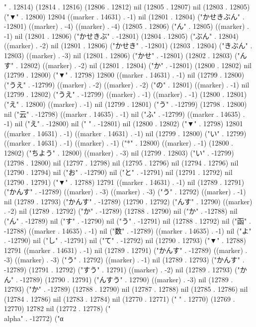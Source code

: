 " . 12814) (12814 . 12816) (12806 . 12812) nil (12805 . 12807) nil (12803 . 12805) ("▼" . 12800) 12804 ((marker . 14631) . -1) nil (12801 . 12804) ("かせきぶん" . -12801) ((marker) . -4) ((marker) . -4) (12805 . 12806) ("ん" . 12805) ((marker) . -1) nil (12801 . 12806) ("かせきぶ" . -12801) (12804 . 12805) ("ぶん" . 12804) ((marker) . -2) nil (12801 . 12806) ("かせき" . -12801) (12803 . 12804) ("きぶん" . 12803) ((marker) . -3) nil (12801 . 12806) ("かせ" . -12801) (12802 . 12803) ("んす" . 12802) ((marker) . -2) nil (12801 . 12804) ("か" . -12801) (12800 . 12802) nil (12799 . 12800) ("▼" . 12798) 12800 ((marker . 14631) . -1) nil (12799 . 12800) ("うえ" . -12799) ((marker) . -2) ((marker) . -2) ("の" . 12801) ((marker) . -1) nil (12799 . 12802) ("うえ" . -12799) ((marker) . -1) ((marker) . -1) (12800 . 12801) ("え" . 12800) ((marker) . -1) nil (12799 . 12801) ("う" . -12799) (12798 . 12800) nil ("云" . -12798) ((marker . 14635) . -1) nil ("ふ" . -12799) ((marker . 14635) . -1) nil ("え" . -12800) nil (" " . -12801) nil (12800 . 12802) ("▼" . 12798) 12801 ((marker . 14631) . -1) ((marker . 14631) . -1) nil (12799 . 12800) ("い" . 12799) ((marker . 14631) . -1) ((marker) . -1) ("*" . 12800) ((marker) . -1) (12800 . 12802) ("ちよう" . 12800) ((marker) . -3) nil (12799 . 12803) ("い" . -12799) (12798 . 12800) nil (12797 . 12798) nil (12795 . 12796) nil (12794 . 12796) nil (12790 . 12794) nil ("お" . -12790) nil ("と" . -12791) nil (12791 . 12792) nil (12790 . 12791) ("▼" . 12788) 12791 ((marker . 14631) . -1) nil (12789 . 12791) ("かんす" . -12789) ((marker) . -3) ((marker) . -3) ("う" . 12792) ((marker) . -1) nil (12789 . 12793) ("かんす" . -12789) (12790 . 12792) ("んす" . 12790) ((marker) . -2) nil (12789 . 12792) ("か" . -12789) (12788 . 12790) nil ("か" . -12788) nil ("ん" . -12789) nil ("す" . -12790) nil ("う" . -12791) nil (12788 . 12792) nil ("函" . -12788) ((marker . 14635) . -1) nil ("数" . -12789) ((marker . 14635) . -1) nil ("よ" . -12790) nil ("し" . -12791) nil ("て" . -12792) nil (12790 . 12793) ("▼" . 12788) 12791 ((marker . 14631) . -1) nil (12789 . 12791) ("かんす" . -12789) ((marker) . -3) ((marker) . -3) ("う" . 12792) ((marker) . -1) nil (12789 . 12793) ("かんす" . -12789) (12791 . 12792) ("すう" . 12791) ((marker) . -2) nil (12789 . 12793) ("かん" . -12789) (12790 . 12791) ("んすう" . 12790) ((marker) . -3) nil (12789 . 12793) ("か" . -12789) (12788 . 12790) nil (12787 . 12788) nil (12785 . 12786) nil (12784 . 12786) nil (12783 . 12784) nil (12770 . 12771) (" " . 12770) (12769 . 12770) 12782 nil (12772 . 12778) ("\\alpha" . -12772) ("α
